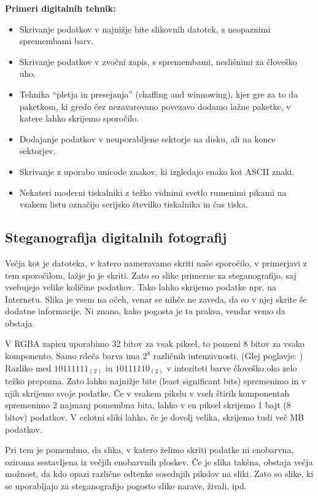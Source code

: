     \textbf{Primeri digitalnih tehnik:}
    \begin{itemize}
        \item Skrivanje podatkov v najnižje bite slikovnih datotek, z neopaznimi spremembami barv.
        \item Skrivanje podatkov v zvočni zapis, s spremembami, neslišnimi za človeško uho.
        \item Tehnika ``pletja in presejanja'' (chaffing and winnowing), kjer gre za to da paketkom, ki gredo čez nezavarovano povezavo dodamo lažne paketke, v katere lahko skrijemo sporočilo.
        \item Dodajanje podatkov v neuporabljene sektorje na disku, ali na konce sektorjev.
        \item Skrivanje z uporabo unicode znakov, ki izgledajo enako kot ASCII znaki.
        \item Nekateri moderni tiskalniki z težko vidnimi svetlo rumenimi pikami na vsakem listu označijo serijsko številko tiskalnika in čas tiska.
        \cite{wikipedia}
    \end{itemize}

\subsection{Steganografija digitalnih fotografij}
    \label{steganografijaslik}
    Večja kot je datoteka, v katero nameravamo skriti naše sporočilo, v primerjavi z tem sporočilom, lažje jo je skriti. Zato so slike primerne za steganografijo, saj vsebujejo velike količine podatkov. Tako lahko skrijemo podatke npr. na Internetu. Slika je vsem na očeh, venar se nihče ne zaveda, da so v njej skrite še dodatne informacije. Ni znano, kako pogosta je ta praksa, vendar vemo da obstaja.
    
    V RGBA zapisu uporabimo 32 bitov za vsak piksel, to pomeni 8 bitov za vsako komponento. Samo rdeča barva ima $2^8$ različnih intenzivnosti. (Glej poglavje: ) Razliko med $10111111_{(2)}$ in $10111110_{(2)}$ v inteziteti barve človeško oko zelo težko prepozna. Zato lahko najnižje bite (least significant bits) spremenimo in v njih skrijemo svoje podatke. Če v vsakem pikslu v vseh štirih komponentah spremenimo 2 najmanj pomembna bita, lahko v en piksel skrijemo 1 bajt (8 bitov) podatkov. V celotni sliki lahko, če je dovolj velika, skrijemo tudi več MB podatkov.

    Pri tem je pomembno, da slika, v katero želimo skriti podatke ni enobarvna, oziroma sestavljena iz večjih enobarvnih ploskev. Če je slika takšna, obstaja večja možnost, da kdo opazi različne odtenke sosednjih pikslov na sliki. Zato so slike, ki se uporabljajo za steganografijo pogosto slike narave, živali, ipd.

